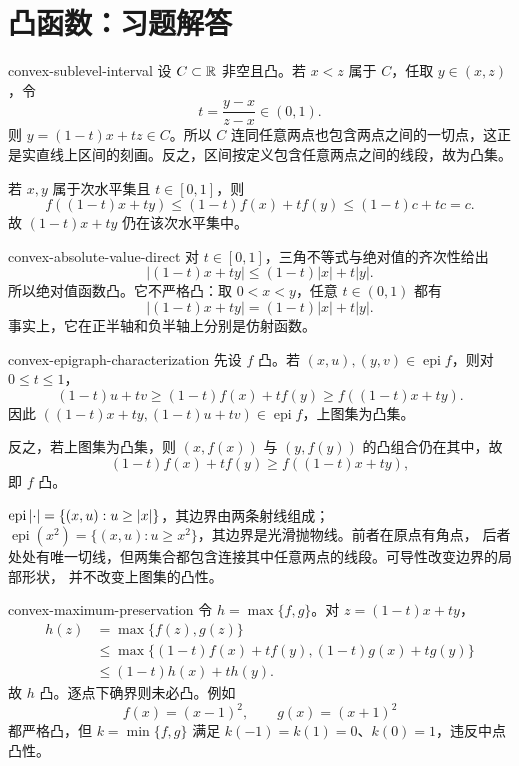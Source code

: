 \chapter{凸函数：习题解答}

\begin{solution}{convex-sublevel-interval}
设 \(C\subset\mathbb{R}\) 非空且凸。若 \(x<z\) 属于 \(C\)，任取 \(y\in(x,z)\)，令
\[
 t=\frac{y-x}{z-x}\in(0,1).
\]
则 \(y=(1-t)x+tz\in C\)。所以 \(C\) 连同任意两点也包含两点之间的一切点，这正是实直线上区间的刻画。反之，区间按定义包含任意两点之间的线段，故为凸集。

若 \(x,y\) 属于次水平集且 \(t\in[0,1]\)，则
\[
 f((1-t)x+ty)\le(1-t)f(x)+tf(y)\le(1-t)c+tc=c.
\]
故 \((1-t)x+ty\) 仍在该次水平集中。
\end{solution}

\begin{solution}{convex-absolute-value-direct}
对 \(t\in[0,1]\)，三角不等式与绝对值的齐次性给出
\[
 |(1-t)x+ty|\le(1-t)|x|+t|y|.
\]
所以绝对值函数凸。它不严格凸：取 \(0<x<y\)，任意 \(t\in(0,1)\) 都有
\[
 |(1-t)x+ty|=(1-t)|x|+t|y|.
\]
事实上，它在正半轴和负半轴上分别是仿射函数。
\end{solution}

\begin{solution}{convex-epigraph-characterization}
先设 \(f\) 凸。若 \((x,u),(y,v)\in\operatorname{epi}f\)，则对 \(0\le t\le1\)，
\[
 (1-t)u+tv\ge(1-t)f(x)+tf(y)\ge f((1-t)x+ty).
\]
因此 \(((1-t)x+ty,(1-t)u+tv)\in\operatorname{epi}f\)，上图集为凸集。

反之，若上图集为凸集，则 \((x,f(x))\) 与 \((y,f(y))\) 的凸组合仍在其中，故
\[
 (1-t)f(x)+tf(y)\ge f((1-t)x+ty),
\]
即 \(f\) 凸。

\(\operatorname{epi}\left|\cdot\right|=\{(x,u):u\ge\left|x\right|\}\)，其边界由两条射线组成；
\(\operatorname{epi}(x^2)=\{(x,u):u\ge x^2\}\)，其边界是光滑抛物线。前者在原点有角点，
后者处处有唯一切线，但两集合都包含连接其中任意两点的线段。可导性改变边界的局部形状，
并不改变上图集的凸性。
\end{solution}

\begin{solution}{convex-maximum-preservation}
令 \(h=\max\{f,g\}\)。对 \(z=(1-t)x+ty\)，
\[
 \begin{aligned}
 h(z)
 &=\max\{f(z),g(z)\}\\
 &\le\max\{(1-t)f(x)+tf(y),(1-t)g(x)+tg(y)\}\\
 &\le(1-t)h(x)+th(y).
 \end{aligned}
\]
故 \(h\) 凸。逐点下确界则未必凸。例如
\[
 f(x)=(x-1)^2,\qquad g(x)=(x+1)^2
\]
都严格凸，但 \(k=\min\{f,g\}\) 满足 \(k(-1)=k(1)=0\)、\(k(0)=1\)，违反中点凸性。
\end{solution}

